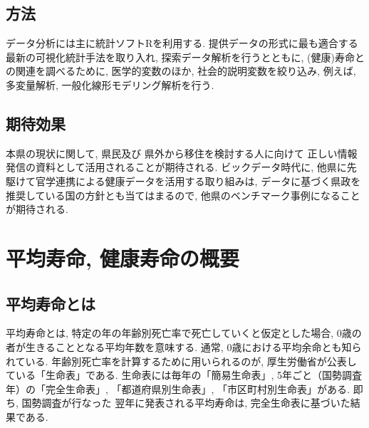\section{方法}
データ分析には主に統計ソフトRを利用する. 提供データの形式に最も適合する最新の可視化統計手法を取り入れ, 探索データ解析を行うとともに, (健康)寿命との関連を調べるために,
医学的変数のほか, 社会的説明変数を絞り込み,
例えば, 多変量解析, 一般化線形モデリング解析を行う.



\section{期待効果}
本県の現状に関して,
県民及び
県外から移住を検討する人に向けて
正しい情報発信の資料として活用されることが期待される.
ビックデータ時代に, 他県に先駆けて官学連携による健康データを活用する取り組みは, データに基づく県政を推奨している国の方針とも当てはまるので, 他県のベンチマーク事例になることが期待される.


\chapter{平均寿命, 健康寿命の概要}

\section{平均寿命とは}


平均寿命とは, 特定の年の年齢別死亡率で死亡していくと仮定とした場合, 0歳の者が生きることとなる平均年数を意味する. 通常, 0歳における平均余命とも知られている.
年齢別死亡率を計算するために用いられるのが,
厚生労働省が公表している「生命表」である.
生命表には毎年の「簡易生命表」, 5年ごと（国勢調査年）の「完全生命表」, 「都道府県別生命表」, 「市区町村別生命表」がある.
即ち, 国勢調査が行なった
翌年に発表される平均寿命は, 完全生命表に基づいた結果である.


%
%
%
%
%
%
%
%



